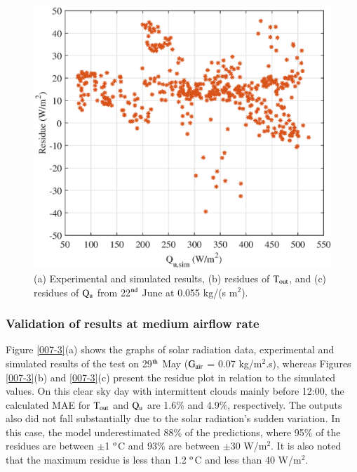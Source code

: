 \begin{figure}[ht!]
\begin{minipage}{0.39\columnwidth}
		\includegraphics[scale=0.5,width=1.0\columnwidth]{figs/0055-residue-6.eps}
	\end{minipage}
	
	\caption{(a) Experimental and simulated results, (b) residues of $\rm{T_{out}}$, and (c) residues of $\rm{Q_{u}}$ from 22$^{\rm{nd}}$ June at 0.055 kg/(s m$^2$).}
	\label{0055-3}
\end{figure}


\subsubsection{Validation of results at medium airflow rate}

Figure \ref{007-3}(a) shows the graphs of solar radiation data, experimental and simulated results of the test on 29$^{\rm{th}}$ May ($\rm{G_{air}}$ = 0.07 kg/m$^2$.s), whereas Figures \ref{007-3}(b) and \ref{007-3}(c) present the residue plot in relation to the simulated values. On this clear sky day with intermittent clouds mainly before 12:00, the calculated MAE for $\rm{T_{out}}$ and $\rm{Q_{u}}$ are 1.6\% and 4.9\%, respectively. The outputs also did not fall substantially due to the solar radiation's sudden variation. In this case, the model underestimated 88\% of the predictions, where 95\% of the residues are between $\pm$1 $^{\rm{o}}$C and 93\% are between $\pm$30 W/m$^2$. It is also noted that the maximum residue is less than 1.2 $^{\rm{o}}$C and less than 40 W/m$^2$. 

